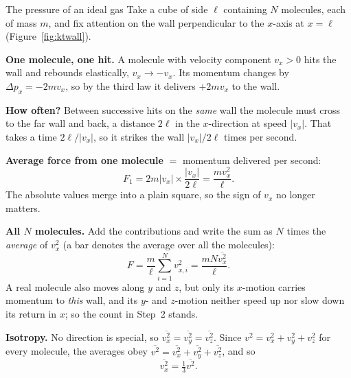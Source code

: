 \begin{figure}[htbp]
\centering
{}
\end{figure}

\begin{derivbox}{The pressure of an ideal gas}
Take a cube of side $\ell$ containing $N$ molecules, each of mass $m$, and fix attention on the wall
perpendicular to the $x$-axis at $x=\ell$ (Figure~\ref{fig:ktwall}).

 \textbf{One molecule, one hit.} A molecule with velocity component $v_x>0$ hits the wall and
rebounds elastically, $v_x\to-v_x$. Its momentum changes by $\Delta p_x=-2mv_x$, so by the third law it
delivers $+2mv_x$ to the wall.

 \textbf{How often?} Between successive hits on the \emph{same} wall the molecule must cross to the
far wall and back, a distance $2\ell$ in the $x$-direction at speed $|v_x|$. That takes a time $2\ell/|v_x|$,
so it strikes the wall $|v_x|/2\ell$ times per second.

 \textbf{Average force from one molecule} $=$ momentum delivered per second:
\[
F_1 = 2m|v_x| \times \frac{|v_x|}{2\ell} = \frac{m v_x^2}{\ell}.
\]
The absolute values merge into a plain square, so the sign of $v_x$ no longer matters.

 \textbf{All $N$ molecules.} Add the contributions and write the sum as $N$ times the
\emph{average} of $v_x^2$ (a bar denotes the average over all the molecules):
\[
F = \frac{m}{\ell}\sum_{i=1}^{N} v_{x,i}^2 = \frac{mN\overline{v_x^2}}{\ell}.
\]
A real molecule also moves along $y$ and $z$, but only its $x$-motion carries momentum to \emph{this}
wall, and its $y$- and $z$-motion neither speed up nor slow down its return in $x$; so the count in
Step~2 stands.

 \textbf{Isotropy.} No direction is special, so
$\overline{v_x^2} = \overline{v_y^2} = \overline{v_z^2}$. Since $v^2 = v_x^2+v_y^2+v_z^2$ for every
molecule, the averages obey $\overline{v^2}=\overline{v_x^2}+\overline{v_y^2}+\overline{v_z^2}$, and so
\[
\overline{v_x^2} = \tfrac13\overline{v^2}.
\]


\end{derivbox}
